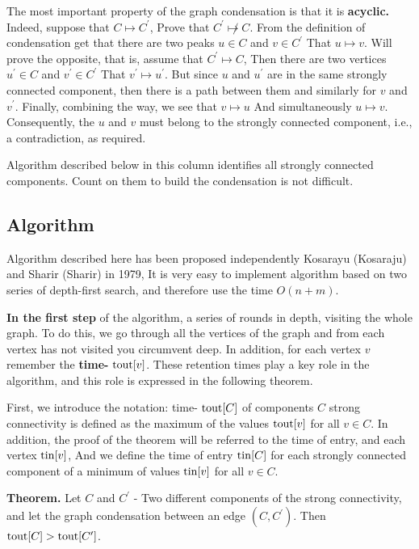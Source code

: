 The most important property of the graph condensation is that it is \textbf{acyclic.} Indeed, suppose that $C \mapsto C ^ \prime$, Prove that $C ^ \prime \not \mapsto C$. From the definition of condensation get that there are two peaks $u \in C$ and $v \in C ^ \prime$ That $u \mapsto v$. Will prove the opposite, that is, assume that $C ^ \prime \mapsto C$, Then there are two vertices $u ^ \prime \in C$ and $v ^ \prime \in C ^ \prime$ That $v ^ \prime \mapsto u ^ \prime$. But since $u$ and $u ^ \prime$ are in the same strongly connected component, then there is a path between them and similarly for $v$ and $v ^ \prime$. Finally, combining the way, we see that $v \mapsto u$ And simultaneously $u \mapsto v$. Consequently, the $u$ and $v$ must belong to the strongly connected component, i.e., a contradiction, as required.

Algorithm described below in this column identifies all strongly connected components. Count on them to build the condensation is not difficult.

\subsection{ Algorithm }

Algorithm described here has been proposed independently Kosarayu (Kosaraju) and Sharir (Sharir) in 1979, It is very easy to implement algorithm based on two series of depth-first search, and therefore use the time $O (n + m)$.

\textbf{In the first step} of the algorithm, a series of rounds in depth, visiting the whole graph. To do this, we go through all the vertices of the graph and from each vertex has not visited you circumvent deep. In addition, for each vertex $v$ remember the \textbf{time-} ${\rm tout} [v]$. These retention times play a key role in the algorithm, and this role is expressed in the following theorem.

First, we introduce the notation: time- ${\rm tout} [C]$ of components $C$ strong connectivity is defined as the maximum of the values ${\rm tout} [v]$ for all $v \in C$. In addition, the proof of the theorem will be referred to the time of entry, and each vertex ${\rm tin} [v]$, And we define the time of entry ${\rm tin} [C]$ for each strongly connected component of a minimum of values ${\rm tin} [v]$ for all $v \in C$.

\textbf{Theorem.} Let $C$ and $C ^ \prime$ - Two different components of the strong connectivity, and let the graph condensation between an edge $(C, C ^ \prime)$. Then ${\rm tout} [C]> {\rm tout} [C ^ \prime]$.


